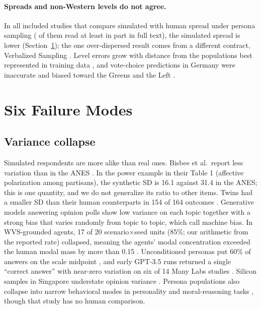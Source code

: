 \documentclass[11pt]{article}
\begin{document}
\paragraph{Spreads and non-Western levels do not agree.} In all \cSpread{} included studies that compare simulated with human spread under persona sampling (\cSpreadReadOK{} of them read at least in part in full text), the simulated spread is lower (Section~\ref{sec:fail}); the one over-dispersed result comes from a different contract, Verbalized Sampling \citep{ozkan2026}. Level errors grow with distance from the populations best represented in training data \citep{atari2023,tao2024,liu2025global}, and vote-choice predictions in Germany were inaccurate and biased toward the Greens and the Left \citep{vonderheyde2025}.

\section{Six Failure Modes}
\label{sec:fail}

\subsection{Variance collapse}
Simulated respondents are more alike than real ones. Bisbee et al.\ report less variation than in the ANES \citep{bisbee2024}. In the power example in their Table 1 (affective polarization among partisans), the synthetic SD is 16.1 against 31.4 in the ANES; this is one quantity, and we do not generalize its ratio to other items. Twins had a smaller SD than their human counterparts in 154 of 164 outcomes \citep{peng2025funhouse}. Generative models answering opinion polls show low variance on each topic together with a strong bias that varies randomly from topic to topic, which \citet{boelaert2025} call machine bias. In WVS-grounded agents, 17 of 20 scenario$\times$seed units (85\%; our arithmetic from the reported rate) collapsed, meaning the agents' modal concentration exceeded the human modal mass by more than 0.15 \citep{ozkan2026}. Unconditioned personas put 60\% of answers on the scale midpoint \citep{lee2026openweight}, and early GPT-3.5 runs returned a single ``correct answer'' with near-zero variation on six of 14 Many Labs studies \citep{park2023diminished}. Silicon samples in Singapore understate opinion variance \citep{lam2026fast}. Persona populations also collapse into narrow behavioral modes in personality and moral-reasoning tasks \citep{xiao2026chameleon}, though that study has no human comparison.
\end{document}
